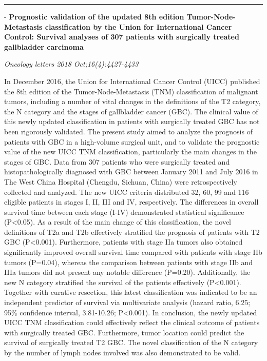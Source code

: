 \documentclass[]{article}
\begin{document}
{}

{}

\begin{center}\rule{0.5\linewidth}{\linethickness}\end{center}

 - \textbf{Prognostic validation of the updated 8th edition
Tumor-Node-Metastasis classification by the Union for International
Cancer Control: Survival analyses of 307 patients with surgically
treated gallbladder carcinoma}

\emph{Oncology letters 2018 Oct;16(4):4427-4433}

In December 2016, the Union for International Cancer Control (UICC)
published the 8th edition of the Tumor-Node-Metastasis (TNM)
classification of malignant tumors, including a number of vital changes
in the definitions of the T2 category, the N category and the stages of
gallbladder cancer (GBC). The clinical value of this newly updated
classification in patients with surgically treated GBC has not been
rigorously validated. The present study aimed to analyze the prognosis
of patients with GBC in a high-volume surgical unit, and to validate the
prognostic value of the new UICC TNM classification, particularly the
main changes in the stages of GBC. Data from 307 patients who were
surgically treated and histopathologically diagnosed with GBC between
January 2011 and July 2016 in The West China Hospital (Chengdu, Sichuan,
China) were retrospectively collected and analyzed. The new UICC
criteria distributed 32, 60, 99 and 116 eligible patients in stages I,
II, III and IV, respectively. The differences in overall survival time
between each stage (I-IV) demonstrated statistical significance
(P\textless{}0.05). As a result of the main change of this
classification, the novel definitions of T2a and T2b effectively
stratified the prognosis of patients with T2 GBC (P\textless{}0.001).
Furthermore, patients with stage IIa tumors also obtained significantly
improved overall survival time compared with patients with stage IIb
tumors (P=0.04), whereas the comparison between patients with stage IIb
and IIIa tumors did not present any notable difference (P=0.20).
Additionally, the new N category stratified the survival of the patients
effectively (P\textless{}0.001). Together with curative resection, this
latest classification was indicated to be an independent predictor of
survival via multivariate analysis (hazard ratio, 6.25; 95\% confidence
interval, 3.81-10.26; P\textless{}0.001). In conclusion, the newly
updated UICC TNM classification could effectively reflect the clinical
outcome of patients with surgically treated GBC. Furthermore, tumor
location could predict the survival of surgically treated T2 GBC. The
novel classification of the N category by the number of lymph nodes
involved was also demonstrated to be valid.
\end{document}
